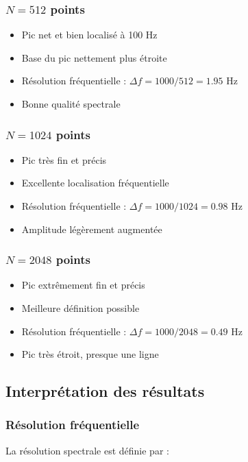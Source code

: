 \documentclass[12pt,a4paper]{article}
\begin{document}
\subsubsection{$N = 512$ points}
\begin{itemize}
    \item Pic net et bien localisé à 100 Hz
    \item Base du pic nettement plus étroite
    \item Résolution fréquentielle : $\Delta f = 1000/512 = 1.95$ Hz
    \item Bonne qualité spectrale
\end{itemize}

\subsubsection{$N = 1024$ points}
\begin{itemize}
    \item Pic très fin et précis
    \item Excellente localisation fréquentielle
    \item Résolution fréquentielle : $\Delta f = 1000/1024 = 0.98$ Hz
    \item Amplitude légèrement augmentée
\end{itemize}

\subsubsection{$N = 2048$ points}
\begin{itemize}
    \item Pic extrêmement fin et précis
    \item Meilleure définition possible
    \item Résolution fréquentielle : $\Delta f = 1000/2048 = 0.49$ Hz
    \item Pic très étroit, presque une ligne
\end{itemize}

\subsection{Interprétation des résultats}

\subsubsection{Résolution fréquentielle}

La résolution spectrale est définie par :
\end{document}
